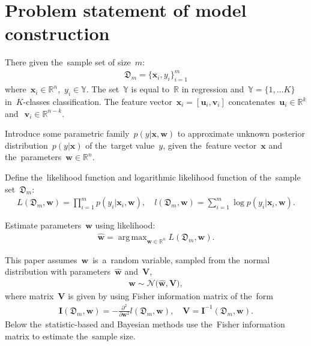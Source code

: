 \documentclass[
11pt,%
tightenlines,%
twoside,%
onecolumn,%
nofloats,%
nobibnotes,%
nofootinbib,%
superscriptaddress,%
noshowpacs,%
centertags]%
{revtex4}
\DeclareMathOperator*{\argmax}{arg\,max}
\begin{document}
\section{Problem statement of model construction}
There given the~sample set of size~$m$:
\[
\label{eq:ps:1}
\begin{aligned}
    \mathfrak{D}_{m} = \{\mathbf{x}_i, y_i\}_{i = 1}^{m}
\end{aligned}
\]
where~$\mathbf{x}_i\in \mathbb{R}^{n}$,~$y_i\in \mathbb{Y}$. The
set~$\mathbb{Y}$ is equal to~$\mathbb{R}$ in regression
and~$\mathbb{Y}=\{1,\dots K\}$ in~$K$-classes classification. The
feature vector~$\mathbf{x}_{i} = [\mathbf{u}_{i}, \mathbf{v}_{i}]$
concatenates~$\mathbf{u}_i\in \mathbb{R}^{k}$ and~$~\mathbf{v}_i\in
\mathbb{R}^{n-k}$.

Introduce some parametric family~$p(y|\mathbf{x}, \mathbf{w})$ to
approximate  unknown posterior distribution~$p(y|\mathbf{x})$ of
the~target value~$y$, given the~feature vector~$\mathbf{x}$ and
the~parameters~$\mathbf{w}\in \mathbb{R}^{n}$.

Define the~likelihood function and logarithmic likelihood function of the~sample set~$\mathfrak{D}_{m}$:
\[
\label{eq:ps:4}
\begin{aligned}
    L\left(\mathfrak{D}_{m}, \mathbf{w}\right) = \prod_{i=1}^{m} p\left(y_{i}|\mathbf{x}_{i},
    \mathbf{w}\right),\quad l\left(\mathfrak{D}_{m}, \mathbf{w}\right) = \sum_{i=1}^{m} \log p\left(y_i|\mathbf{x}_{i}, \mathbf{w}\right).
\end{aligned}
\]

Estimate parameters~$\mathbf{w}$ using likelihood:
\[
\label{eq:ps:5}
\begin{aligned}
    \hat{\mathbf{w}} = \argmax_{\mathbf{w}\in\mathbb{R}^{n}}L\left(\mathfrak{D}_{m}, \mathbf{w}\right).
\end{aligned}
\]

This paper assumes~$\mathbf{w}$~is~a~random variable, sampled from the~normal distribution with parameters~$\hat{\mathbf{w}}$ and~$\mathbf{V}$,
\[
\label{eq:ps:5'}
\begin{aligned}
 \mathbf{w} \sim \mathcal{N}\bigr(\hat{\mathbf{w}}, \mathbf{V}\bigr),
\end{aligned}
\]
where matrix~$\mathbf{V}$ is given by using Fisher information matrix of the~form
\[
\label{eq:ps:6}
\begin{aligned}
    \mathbf{I}\left(\mathfrak{D}_{m}, \mathbf{w}\right) = -\frac{\partial^2}{\partial \mathbf{w}^{2}}l\left(\mathfrak{D}_{m}, \mathbf{w}\right), \quad \mathbf{V} = \mathbf{I}^{-1}\left(\mathfrak{D}_{m}, \mathbf{w}\right).
\end{aligned}
\]
Below the~statistic-based and Bayesian methods use the~Fisher information matrix to estimate the~sample size.
\end{document}
